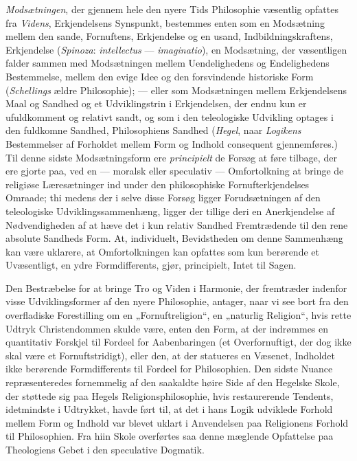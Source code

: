 \documentclass[12pt,a4paper]{book}
\newcommand{\opage}[1]{\marginnote{\footnotesize\textit{[#1]}}}
\begin{document}
\emph{Modsætningen}, der gjennem hele den nyere Tids Philosophie væsentlig opfattes fra
\emph{Videns}, Erkjendelsens Synspunkt, bestemmes enten som en Modsætning mellem den
sande, Fornuftens, Erkjendelse og en usand, Indbildningskraftens, Erkjendelse
(\emph{Spinoza}: \textit{intellectus} --- \textit{imaginatio}), en Modsætning, der væsentligen falder
sammen med Modsætningen mellem Uendelighedens og Endelighedens Bestemmelse, mellem
den evige Idee og den forsvindende historiske Form (\emph{Schellings} ældre
Philosophie); --- eller som Modsætningen mellem Erkjendelsens Maal og Sandhed og
et Udviklingstrin i Erkjendelsen, der endnu kun er ufuldkomment og relativt sandt,
og som i den teleologiske Udvikling optages i den fuldkomne Sandhed, Philosophiens
Sandhed (\emph{Hegel}, naar \emph{Logikens} Bestemmelser af Forholdet mellem Form og Indhold
consequent gjennemføres.) Til denne sidste Modsætningsform ere \emph{principielt} de
Forsøg at føre tilbage, der ere gjorte paa, ved en --- moralsk eller speculativ
--- Omfortolkning at bringe de religiøse Læresætninger ind under den philosophiske
Fornufterkjendelses Omraade; thi medens der i selve disse Forsøg ligger
Forudsætningen af den teleologiske Udviklingssammenhæng, ligger der tillige deri
en Anerkjendelse af Nødvendigheden af at hæve det i kun relativ Sandhed
Fremtrædende til den rene absolute Sandheds Form. At, individuelt, Bevidstheden
om denne Sammenhæng kan være uklarere, at Omfortolkningen kan opfattes som kun
berørende et Uvæsentligt, en ydre Formdifferents, gjør, principielt, Intet til
Sagen.

\opage{24}Den Bestræbelse for at bringe Tro og Viden i Harmonie, der fremtræder indenfor
visse Udviklingsformer af den nyere Philosophie, antager, naar vi see bort fra den
overfladiske Forestilling om en „Fornuftreligion“, en „naturlig Religion“, hvis
rette Udtryk Christendommen skulde være, enten den Form, at der indrømmes en
quantitativ Forskjel til Fordeel for Aabenbaringen (et Overfornuftigt, der dog
ikke skal være et Fornuftstridigt), eller den, at der statueres en Væsenet,
Indholdet ikke berørende Formdifferents til Fordeel for Philosophien. Den sidste
Nuance repræsenteredes fornemmelig af den saakaldte høire Side af den Hegelske
Skole, der støttede sig paa Hegels Religionsphilosophie, hvis restaurerende
Tendents, idetmindste i Udtrykket, havde ført til, at det i hans Logik udviklede
Forhold mellem Form og Indhold var blevet uklart i Anvendelsen paa Religionens
Forhold til Philosophien. Fra hiin Skole overførtes saa denne mæglende Opfattelse
paa Theologiens Gebet i den speculative Dogmatik.
\end{document}
